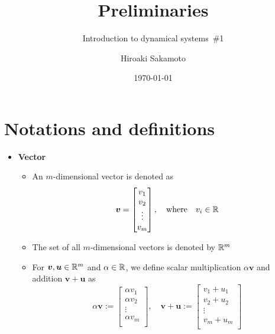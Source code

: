 \documentclass[12pt,a4paper]{article}
\title{Preliminaries}
\subtitle{Introduction to dynamical systems~\#1}
\author{Hiroaki Sakamoto}
\date{\today}
\begin{document}
\maketitle
\tableofcontents

\section{Notations and definitions}

\begin{itemize}
\item \textbf{Vector}
  \begin{itemize}
  \item An $m$-dimensional vector is denoted as
    \begin{equation}\nonumber%
      \bm{v} =
      \begin{bmatrix}
        v_{1} \\
        v_{2} \\
        \vdots \\
        v_{m} \\
      \end{bmatrix},
      \quad\text{where}\quad
      v_{i}\in \R
    \end{equation}
  \item The set of all $m$-dimensional vectors is denoted by $\mathbb{R}^{m}$
  \item For $\bm{v}, \bm{u}\in \mathbb{R}^{m}$ and $\alpha \in \mathbb{R}$,
    we define scalar multiplication $\alpha\bm{v}$ and addition $\bm{v}+\bm{u}$ as
    \begin{equation}\nonumber%
      \alpha \bm{v}
      := 
      \begin{bmatrix}
        \alpha v_{1} \\
        \alpha v_{2} \\
        \vdots \\
        \alpha v_{m} \\
      \end{bmatrix},
      \quad
      \bm{v} + \bm{u}
      := 
      \begin{bmatrix}
        v_{1} + u_{1} \\
        v_{2} + u_{2} \\
        \vdots \\
        v_{m} + u_{m} \\
      \end{bmatrix}
    \end{equation}
  \end{itemize}



\end{itemize}
\end{document}
